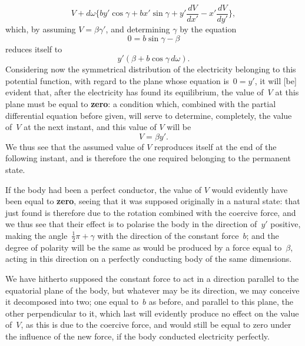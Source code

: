 \documentclass[11pt,notitlepage]{amsart}
\let\Emphasis\textbf
\begin{document}
\[
V+d\omega\biggl\{
  by'\cos\gamma+bx'\sin\gamma
  +y'\frac{dV}{dx'}-x'\frac{dV}{dy'}
\biggr\},
\]
which, by assuming $V=\beta\gamma'$, and determining $\gamma$ by the equation
\[
0=b\sin\gamma-\beta
\]
reduces itself to
\[
y'(\beta+b\cos\gamma\,d\omega).
\]
Considering now the symmetrical distribution of the electricity belonging to
this potential function, with regard to the plane whose equation is~${0=y'}$, it
will [be] evident that,
after the electricity has found its equilibrium, the value of~$V$
at this plane must be equal to \Emphasis{zero}:
a condition which, combined with the
partial differential equation before given, will serve to determine, completely,
the value of~$V$ at the next instant, and this value of $V$ will be
\[
V=\beta y'.
\]
We thus see that the assumed value of $V$ reproduces itself at the end of the
following instant, and is therefore the one required belonging to the permanent
state.

If the body had been a perfect conductor, the value of $V$ would
evidently have been equal to \Emphasis{zero},
seeing that it was supposed originally in
a natural state: that just found is therefore due to the rotation combined with
the coercive force, and we thus see that their effect is to polarise the body
in the direction of~$y'$ positive,
making the angle~${\frac12\pi+\gamma}$ with the direction
of the constant force~$b$; and the degree of polarity will be the same as would
be produced by a force equal to~$\beta$, acting in this direction on a perfectly
conducting body of the same dimensions.

We have hitherto supposed the constant force to act in a direction
parallel to the equatorial plane of the body, but whatever may be its direction,
we may conceive it decomposed into two; one equal to~$b$ as before, and
parallel to this plane, the other perpendicular to it, which last will evidently
produce no effect on the value of~$V$, as this is due to the coercive force,
and would still be equal to zero under the influence of the new force, if the
body conducted electricity perfectly.
\end{document}
